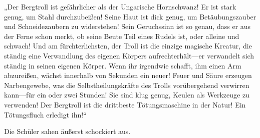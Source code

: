 „Der Bergtroll ist gefährlicher als der Ungarische Hornschwanz! Er ist stark genug, um Stahl durchzubeißen! Seine Haut ist dick genug, um Betäubungszauber und Schneidezaubern zu widerstehen! Sein Geruchssinn ist so genau, dass er aus der Ferne schon merkt, ob seine Beute Teil eines Rudels ist, oder alleine und schwach! Und am fürchterlichsten, der Troll ist die einzige magische Kreatur, die ständig eine Verwandlung des eigenen Körpers aufrechterhält—er verwandelt sich ständig in seinen eigenen Körper. Wenn ihr irgendwie schafft, ihm einen Arm abzureißen, wächst innerhalb von Sekunden ein neuer! Feuer und Säure erzeugen Narbengewebe, was die Selbstheilungskräfte des Trolls vorübergehend verwirren kann—für ein oder zwei Stunden! Sie sind klug genug, Keulen als Werkzeuge zu verwenden! Der Bergtroll ist die drittbeste Tötungsmaschine in der Natur! Ein Tötungsfluch erledigt ihn!“

Die Schüler sahen äußerst schockiert aus.

